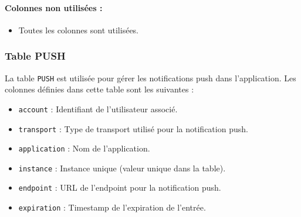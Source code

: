 \documentclass[a4paper,11pt]{article}
\begin{document}
\paragraph{Colonnes non utilisées :}
\begin{itemize}
    \item Toutes les colonnes sont utilisées.
\end{itemize}

\subsubsection*{Table PUSH}

La table \texttt{PUSH} est utilisée pour gérer les notifications push dans l'application. Les colonnes définies dans cette table sont les suivantes :

\begin{itemize}
    \item \texttt{account} : Identifiant de l'utilisateur associé.
    \item \texttt{transport} : Type de transport utilisé pour la notification push.
    \item \texttt{application} : Nom de l'application.
    \item \texttt{instance} : Instance unique (valeur unique dans la table).
    \item \texttt{endpoint} : URL de l'endpoint pour la notification push.
    \item \texttt{expiration} : Timestamp de l'expiration de l'entrée.
\end{itemize}
\end{document}
